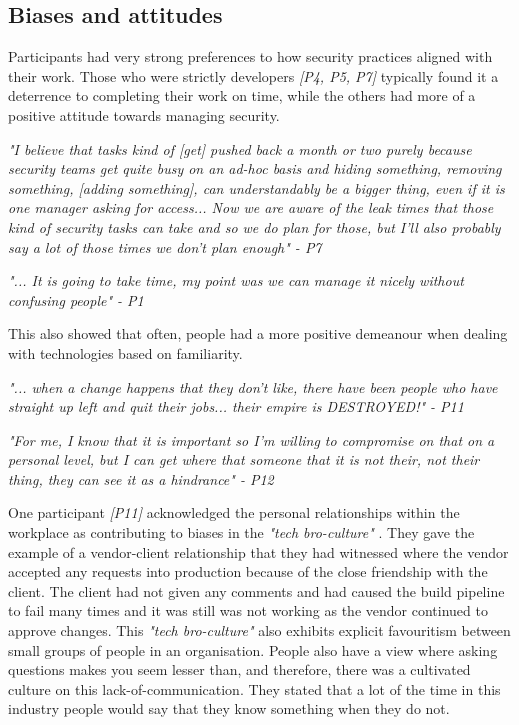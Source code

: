 \subsection{Biases and attitudes}

\par Participants had very strong preferences to how security practices aligned with their work. Those who were strictly developers \textit{[P4, P5, P7]} typically found it a deterrence to completing their work on time, while the others had more of a positive attitude towards managing security. 
\newline
\par 
\textit{"I believe that tasks kind of [get] pushed back a month or two purely because security teams get quite busy on an ad-hoc basis and hiding something, removing something, [adding something], can understandably be a bigger thing, even if it is one manager asking for access... Now we are aware of the leak times that those kind of security tasks can take and so we do plan for those, but I'll also probably say a lot of those times we don't plan enough" - P7}
\newline
\par
\textit{"... It is going to take time, my point was we can manage it nicely without confusing people" - P1}
\newline
\par
This also showed that often, people had a more positive demeanour when dealing with technologies based on familiarity. 
\newline
\par \textit{"... when a change happens that they don't like, there have been people who have straight up left and quit their jobs... their empire is DESTROYED!"  - P11}
\newline
\par
\textit{"For me, I know that it is important so I'm willing to compromise on that on a personal level, but I can get where that someone that it is not their, not their thing, they can see it as a hindrance"  - P12}
\newline
\par One participant \textit{[P11]} acknowledged the personal relationships within the workplace as contributing to biases in the \textit{"tech bro-culture" }. They gave the example of a vendor-client relationship that they had witnessed where the vendor accepted any requests into production because of the close friendship with the client. The client had not given any comments and had caused the build pipeline to fail many times and it was still was not working as the vendor continued to approve changes. This \textit{"tech bro-culture"} also exhibits explicit favouritism between small groups of people in an organisation. People also have a view where asking questions makes you seem lesser than, and therefore, there was a cultivated culture on this lack-of-communication. They stated that a lot of the time in this industry people would say that they know something when they do not. 

